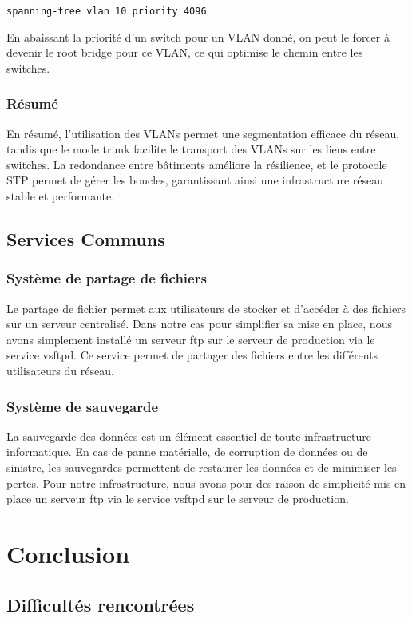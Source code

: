 \documentclass[a4paper,12pt]{report}
\begin{document}
                \begin{verbatim}
spanning-tree vlan 10 priority 4096
                \end{verbatim}

                En abaissant la priorité d'un switch pour un VLAN donné, on peut le forcer à devenir le root bridge pour ce VLAN, ce qui optimise le chemin entre les switches.

            \subsection{Résumé}
                En résumé, l'utilisation des VLANs permet une segmentation efficace du réseau, tandis que le mode trunk facilite le transport des VLANs sur les liens entre switches. La redondance entre bâtiments améliore la résilience, et le protocole STP permet de gérer les boucles, garantissant ainsi une infrastructure réseau stable et performante.


        \section{Services Communs}
            \subsection{Système de partage de fichiers}
                Le partage de fichier permet aux utilisateurs de stocker et d'accéder à des fichiers sur un serveur centralisé. Dans notre cas pour simplifier sa mise en place, nous avons simplement installé un serveur ftp sur le serveur de production via le service vsftpd. Ce service permet de partager des fichiers entre les différents utilisateurs du réseau.
            \subsection{Système de sauvegarde}
                La sauvegarde des données est un élément essentiel de toute infrastructure informatique. En cas de panne matérielle, de corruption de données ou de sinistre, les sauvegardes permettent de restaurer les données et de minimiser les pertes. Pour notre infrastructure, nous avons pour des raison de simplicité mis en place un serveur ftp via le service vsftpd sur le serveur de production.
    \chapter{Conclusion}
        \section{Difficultés rencontrées}
\end{document}
